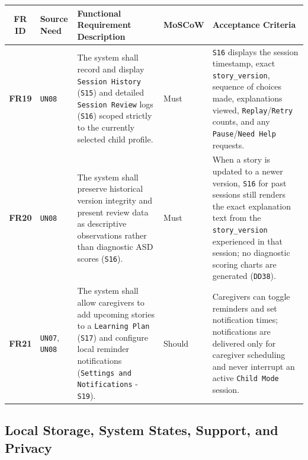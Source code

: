 \begin{footnotesize}
\noindent\begin{xltabular}{\textwidth}{|c|p{2.2cm}|X|p{2.0cm}|p{2.4cm}|}
\hline
\textbf{FR ID} & \textbf{Source Need} & \textbf{Functional Requirement Description} & \textbf{MoSCoW} & \textbf{Acceptance Criteria} \\ \hline
\endhead
\textbf{FR19} & \texttt{UN08} & The system shall record and display \texttt{Session History} (\texttt{S15}) and detailed \texttt{Session Review} logs (\texttt{S16}) scoped strictly to the currently selected child profile. & Must & \texttt{S16} displays the session timestamp, exact \texttt{story\_version}, sequence of choices made, explanations viewed, \texttt{Replay}/\texttt{Retry} counts, and any \texttt{Pause}/\texttt{Need Help} requests. \\ \hline
\textbf{FR20} & \texttt{UN08} & The system shall preserve historical version integrity and present review data as descriptive observations rather than diagnostic ASD scores (\texttt{S16}). & Must & When a story is updated to a newer version, \texttt{S16} for past sessions still renders the exact explanation text from the \texttt{story\_version} experienced in that session; no diagnostic scoring charts are generated (\texttt{DD38}). \\ \hline
\textbf{FR21} & \texttt{UN07}, \texttt{UN08} & The system shall allow caregivers to add upcoming stories to a \texttt{Learning Plan} (\texttt{S17}) and configure local reminder notifications (\texttt{Settings and Notifications} - \texttt{S19}). & Should & Caregivers can toggle reminders and set notification times; notifications are delivered only for caregiver scheduling and never interrupt an active \texttt{Child Mode} session. \\ \hline
\end{xltabular}
\end{footnotesize}



\subsection{Local Storage, System States, Support, and Privacy}


